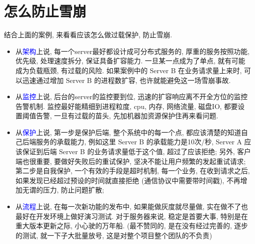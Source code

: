 \gaccobsplitinv

\section {\ZHH 怎么防止雪崩} {
    {结合上面的案例, 来看看应该怎么做过载保护, 防止雪崩. }
    \begin{itemize}
    \item {从\textcolor{blue}{架构}上说, 每一个server最好都设计成可分布式服务的, 厚重的服务按照功能, 优先级, 处理速度拆分, 保证具备扩容能力. 一旦某一点成为了单点, 就有可能成为负载瓶颈, 有过载的风险. 如果案例中的 Server B 在业务请求量上来时, 可以迅速通过增加 Server B 的进程数扩容, 也许就能避免这一场雪崩事故. }
    \item {从\textcolor{blue}{监控}上说, 后台的server的监控要到位, 迅速的扩容响应离不开全方位的监控告警机制. 监控最好能精细到进程粒度, cpu, 内存, 网络流量, 磁盘IO, 都要设置阈值告警, 一旦有过载的苗头, 先加机器加资源保护住再来看问题. }
    \item {从\textcolor{blue}{保护}上说, 第一步是保护后端, 整个系统中的每一个点, 都应该清楚的知道自己后端服务的承载能力, 例如这里 Server B 的承载能力是10次/秒,  Server A 应该保证到后端 Server B 的业务请求量低于这个值, 超过了应该拒绝; 另外, 客户端也很重要, 要做好失败后的重试保护, 坚决不能让用户频繁的发起重试请求; 第二步是自我保护, 一个有效的手段是超时机制, 每一个业务, 在收到请求之后, 如果发现已经超过预设的时间就直接拒绝 (通信协议中需要带时间戳), 不再增加无谓的压力, 防止问题扩散;}
    \item {从\textcolor{blue}{流程}上说, 在每一次新功能的发布中, 如果能做灰度就尽量做, 实在做不了也最好在开发环境上做好演习测试. 对于服务器来说, 稳定是首要大事, 特别是在重大版本更新之际, 小心驶的万年船. (最不赞同的, 是在没有经过完善的, 逐步的测试, 就一下子大批量放号, 这是对整个项目整个团队的不负责)}
    \end{itemize}
}



